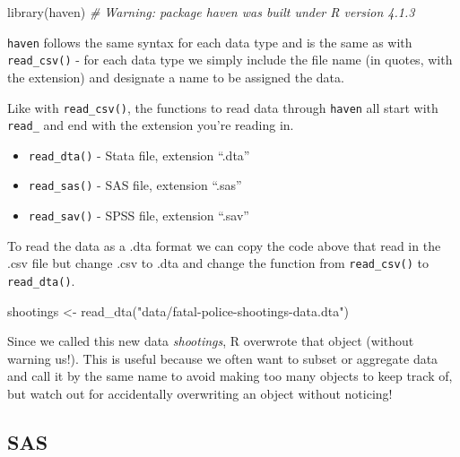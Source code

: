 \documentclass[
  a4paper,
]{krantz}
\makeatletter
\newenvironment{Shaded}{\begin{snugshade}}{\end{snugshade}}
\newcommand{\CommentTok}[1]{\textcolor[rgb]{0.56,0.35,0.01}{\textit{#1}}}
\newcommand{\FunctionTok}[1]{\textcolor[rgb]{0.00,0.00,0.00}{#1}}
\newcommand{\NormalTok}[1]{#1}
\newcommand{\OtherTok}[1]{\textcolor[rgb]{0.56,0.35,0.01}{#1}}
\newcommand{\StringTok}[1]{\textcolor[rgb]{0.31,0.60,0.02}{#1}}
\providecommand{\tightlist}{%
  \setlength{\itemsep}{0pt}\setlength{\parskip}{0pt}}
\newenvironment{kframe}{%
\medskip{}
\setlength{\fboxsep}{.8em}
 \def\at@end@of@kframe{}%
 \ifinner\ifhmode%
  \def\at@end@of@kframe{\end{minipage}}%
  \begin{minipage}{\columnwidth}%
 \fi\fi%
 \def\FrameCommand##1{\hskip\@totalleftmargin \hskip-\fboxsep
 \colorbox{shadecolor}{##1}\hskip-\fboxsep
     \hskip-\linewidth \hskip-\@totalleftmargin \hskip\columnwidth}%
 \MakeFramed {\advance\hsize-\width
   \@totalleftmargin\z@ \linewidth\hsize
   \@setminipage}}%
 {\par\unskip\endMakeFramed%
 \at@end@of@kframe}
\renewenvironment{Shaded}{\begin{kframe}}{\end{kframe}}
\makeatother
\begin{document}
\begin{Shaded}
\begin{Highlighting}[]
\FunctionTok{library}\NormalTok{(haven)}
\CommentTok{\# Warning: package \textquotesingle{}haven\textquotesingle{} was built under R version 4.1.3}
\end{Highlighting}
\end{Shaded}

\texttt{haven} follows the same syntax for each data type
and is the same as with \texttt{read\_csv()} - for each data
type we simply include the file name (in quotes, with the
extension) and designate a name to be assigned the data.

Like with \texttt{read\_csv()}, the functions to read data
through \texttt{haven} all start with \texttt{read\_} and
end with the extension you're reading in.

\begin{itemize}
\tightlist
\item
  \texttt{read\_dta()} - Stata file, extension ``.dta''
\item
  \texttt{read\_sas()} - SAS file, extension ``.sas''
\item
  \texttt{read\_sav()} - SPSS file, extension ``.sav''
\end{itemize}

To read the data as a .dta format we can copy the code above
that read in the .csv file but change .csv to .dta and
change the function from \texttt{read\_csv()} to
\texttt{read\_dta()}.

\begin{Shaded}
\begin{Highlighting}[]
\NormalTok{shootings }\OtherTok{\textless{}{-}} \FunctionTok{read\_dta}\NormalTok{(}\StringTok{"data/fatal{-}police{-}shootings{-}data.dta"}\NormalTok{)}
\end{Highlighting}
\end{Shaded}

Since we called this new data \emph{shootings}, R overwrote
that object (without warning us!). This is useful because we
often want to subset or aggregate data and call it by the
same name to avoid making too many objects to keep track of,
but watch out for accidentally overwriting an object without
noticing!

\hypertarget{sas}{%
\subsection{SAS}\label{sas}}
\end{document}
